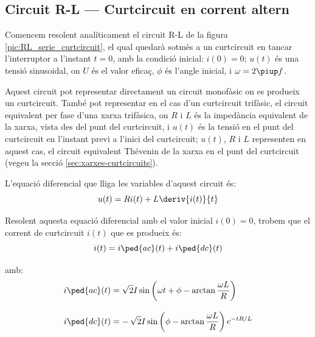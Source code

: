 \subsection {Circuit R-L --- Curtcircuit en corrent altern}\label{sec:ccRL}

Comencem resolent analíticament el circuit R-L de la figura \vref{pic:RL_serie_curtcircuit}, el qual quedarà sotmès a un curtcircuit en tancar l'interruptor a l'instant $t=0$, amb la condició inicial: $i(0) = 0$; $u(t)$ és una tensió sinusoidal, on $U$ és el valor eficaç, $\phi$ és l'angle inicial, i $\omega = 2 \piup f$.

Aquest circuit pot representar directament un circuit monofàsic on es produeix un curtcircuit. També pot representar en el cas d'un curtcircuit trifàsic,  el circuit equivalent per fase d'una xarxa trifàsica, on $R$ i $L$ és la impedància equivalent de la xarxa, vista des del punt del curtcircuit, i $u(t)$ és la tensió en el punt del curtcircuit en l'instant previ a l'inici del curtcircuit; $u(t)$,  $R$ i $L$ representen en aquest cas, el circuit equivalent Thévenin de la xarxa en el punt del curtcircuit (vegeu la secció \ref{sec:xarxes-curtcircuits}).

\begin{center}
    
    \label{pic:RL_serie_curtcircuit}
\end{center}

L'equació diferencial que lliga les variables d'aquest circuit és:
\begin{equation}
    u(t) = R i(t) + L \deriv{i(t)}{t}
\end{equation}

Resolent aquesta equació diferencial amb el valor inicial $i(0)=0$, trobem que el corrent de curtcircuit $i(t)$  que es produeix  és:
\begin{equation}
    i(t) = i\ped{ac}(t) + i\ped{dc}(t)
    \label{eq:RL_serie_curtcircuit_icc}
\end{equation}

amb:
\begin{subequations}
\begin{align}
    i\ped{ac}(t) &= \sqrt{2} I \sin\left(\omega t + \phi - \arctan\frac{\omega L}{R}\right) \label{eq:RL_serie_curtcircuit_iac}\\[3mm]
    i\ped{dc}(t) &= -\,\sqrt{2} I\sin\left(\phi - \arctan\frac{\omega L}{R}\right) e^{-t R/L}\label{eq:RL_serie_curtcircuit_idc}
\end{align}
\end{subequations}


